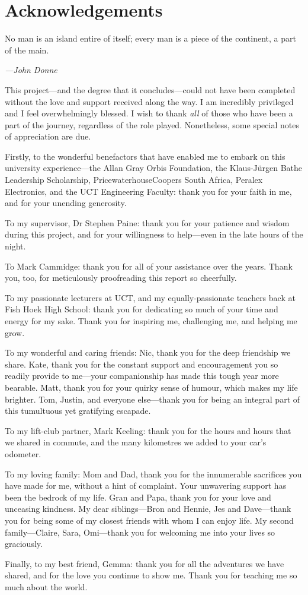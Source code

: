\documentclass[class=report,11pt,crop=false]{standalone}
\begin{document}
\chapter*{Acknowledgements}
\epigraph{No man is an island entire of itself; every man is a piece of the continent, a part of the main.}%
    {\emph{---John Donne}}
\vspace{0.3cm}

This project---and the degree that it concludes---could not have been completed without the love and support received along the way. I am incredibly privileged and I feel overwhelmingly blessed. I wish to thank \emph{all} of those who have been a part of the journey, regardless of the role played. Nonetheless, some special notes of appreciation are due.

Firstly, to the wonderful benefactors that have enabled me to embark on this university experience---the Allan Gray Orbis Foundation, the Klaus-J\"urgen Bathe Leadership Scholarship, PricewaterhouseCoopers South Africa, Peralex Electronics, and the UCT Engineering Faculty: thank you for your faith in me, and for your unending generosity.

To my supervisor, Dr Stephen Paine: thank you for your patience and wisdom during this project, and for your willingness to help---even in the late hours of the night.

To Mark Cammidge: thank you for all of your assistance over the years. Thank you, too, for meticulously proofreading this report so cheerfully.

To my passionate lecturers at UCT, and my equally-passionate teachers back at Fish Hoek High School: thank you for dedicating so much of your time and energy for my sake. Thank you for inspiring me, challenging me, and helping me grow.

To my wonderful and caring friends: Nic, thank you for the deep friendship we share. Kate, thank you for the constant support and encouragement you so readily provide to me---your companionship has made this tough year more bearable. Matt, thank you for your quirky sense of humour, which makes my life brighter. Tom, Justin, and everyone else---thank you for being an integral part of this tumultuous yet gratifying escapade.

To my lift-club partner, Mark Keeling: thank you for the hours and hours that we shared in commute, and the many kilometres we added to your car's odometer.

To my loving family: Mom and Dad, thank you for the innumerable sacrifices you have made for me, without a hint of complaint. Your unwavering support has been the bedrock of my life. Gran and Papa, thank you for your love and unceasing kindness. My dear siblings---Bron and Hennie, Jes and Dave---thank you for being some of my closest friends with whom I can enjoy life. My second family---Claire, Sara, Omi---thank you for welcoming me into your lives so graciously.

Finally, to my best friend, Gemma: thank you for all the adventures we have shared, and for the love you continue to show me. Thank you for teaching me so much about the world.
\end{document}
